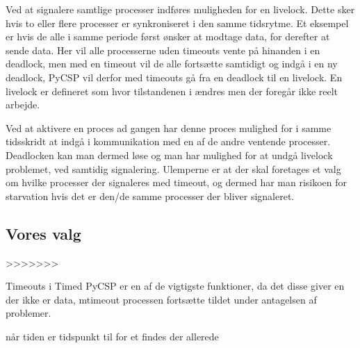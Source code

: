 Ved at signalere samtlige processer indføres muligheden for en livelock. Dette
sker hvis to eller flere processer er  synkroniseret i den samme tidsrytme.
Et eksempel er hvis de alle i samme periode først ønsker at modtage data, for 
derefter at sende data. Her vil alle processerne uden timeouts vente på 
hinanden i en deadlock, men med en timeout vil de alle fortsætte samtidigt og 
indgå i en ny deadlock, PyCSP vil derfor med timeouts gå fra en deadlock til 
en livelock. En livelock er defineret som hvor tilstandenen i ændres men der
foregår ikke reelt arbejde. 

Ved at aktivere en proces ad gangen har denne proces mulighed for i samme 
tidsskridt at indgå i kommunikation med en af de andre ventende processer. 
Deadlocken kan man dermed løse og man har mulighed for at undgå livelock 
problemet, ved samtidig signalering.
Ulemperne er at der skal foretages et valg om hvilke processer der signaleres 
med  timeout, og dermed har man risikoen for starvation hvis det 
er den/de samme processer der bliver signaleret.


\subsection{Vores valg} >>>>>>> 

Timeouts i Timed PyCSP er en af de vigtigste funktioner, da det disse giver en
der ikke er data, mtimeout processen fortsætte  tildet under antagelsen af 
problemer.

når tiden er  tidspunkt
til for et findes der allerede  
